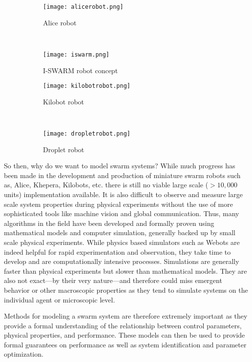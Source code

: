 \documentclass[Main.tex]{subfiles}
\begin{document}
\begin{figure}[!ht]
\centering\begin{subfigure}{.5\textwidth}
\centering\texttt{[image: alicerobot.png]}
\caption{Alice robot}
\end{subfigure}~
\centering\begin{subfigure}{.5\textwidth}
\centering\texttt{[image: iswarm.png]}
\caption{I-SWARM robot concept}
\end{subfigure}\vspace{1cm}
\centering\begin{subfigure}{.5\textwidth}
\centering\texttt{[image: kilobotrobot.png]}
\caption{Kilobot robot}
\end{subfigure}~
\centering\begin{subfigure}{.5\textwidth}
\centering\texttt{[image: dropletrobot.png]}
\caption{Droplet robot}
\end{subfigure}
\caption{}\label{fig:swarmbots}
\end{figure}

So then, why do we want to model swarm systems? While much progress has been made in the development and production of miniature swarm robots such as, Alice, Khepera, Kilobots, etc.\cite{Dorigo2005, Seyfried2005, Mondada2009, Caprari1998, Rubenstein2012} there is still no viable large scale ($> 10,000$ units) implementation available. It is also difficult to observe and measure large scale system properties during physical experiments without the use of more sophisticated tools like machine vision and global communication. Thus, many algorithms in the field have been developed and formally proven using mathematical models and computer simulation, generally backed up by small scale physical experiments. While physics based simulators such as Webots\cite{Michel1998} are indeed helpful for rapid experimentation and observation, they take time to develop and are computationally intensive processes. Simulations are generally faster than physical experiments but slower than mathematical models. They are also not exact---by their very nature---and therefore could miss emergent behavior or other macroscopic properties as they tend to simulate systems on the individual agent or microscopic level. 

Methods for modeling a swarm system are therefore extremely important as they provide a formal understanding of the relationship between control parameters, physical properties, and performance. These models can then be used to provide formal guarantees on performance as well as system identification and parameter optimization\cite{Correll2006a, Correll2008}.
\end{document}
